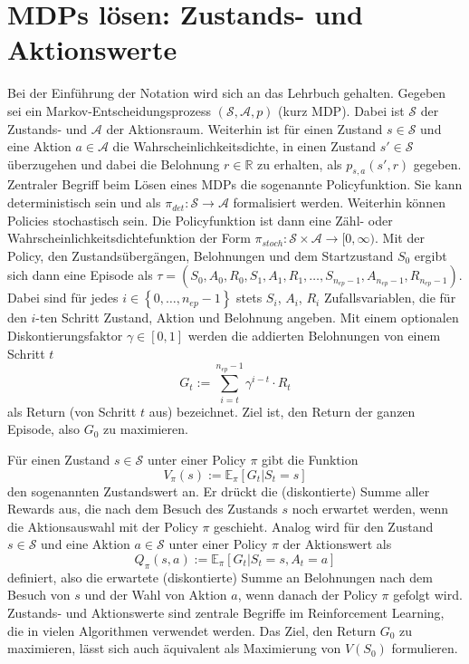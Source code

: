 \section{MDPs lösen: Zustands- und Aktionswerte}
\label{section:mdp_fundamentals}
Bei der Einführung der Notation wird sich an das Lehrbuch \cite{Sutton1998} gehalten.
Gegeben sei ein Markov-Entscheidungsprozess $(\mathcal{S}, \mathcal{A}, p)$ (kurz MDP).
Dabei ist $\mathcal{S}$ der Zustands- und $\mathcal{A}$ der Aktionsraum.
Weiterhin ist für einen Zustand $s\in \mathcal{S}$ und eine Aktion $a \in \mathcal{A}$ die Wahrscheinlichkeitsdichte, in einen Zustand $s' \in \mathcal{S}$ überzugehen und dabei die Belohnung $r \in \mathbb{R}$ zu erhalten, als $p_{s,a}(s', r)$ gegeben.
Zentraler Begriff beim Lösen eines MDPs die sogenannte Policyfunktion.
Sie kann deterministisch sein und als $\pi_{det}: \mathcal{S} \rightarrow \mathcal{A}$ formalisiert werden.
Weiterhin können Policies stochastisch sein.
Die Policyfunktion ist dann eine Zähl- oder Wahrscheinlichkeitsdichtefunktion der Form $\pi_{stoch}: \mathcal{S}\times\mathcal{A}\rightarrow [0, \infty)$.
Mit der Policy, den Zustandsübergängen, Belohnungen und dem Startzustand $S_0$ ergibt sich dann eine Episode als $\tau = \left(S_0, A_0, R_0, S_1, A_1, R_1, \dots, S_{n_{ep} - 1}, A_{n_{ep} - 1}, R_{n_{ep} - 1}\right)$.
Dabei sind für jedes $i \in \left\lbrace0, \dots, n_{ep} - 1\right\rbrace$ stets $S_i$, $A_i$, $R_i$ Zufallsvariablen, die für den $i$-ten Schritt Zustand, Aktion und Belohnung angeben.
Mit einem optionalen Diskontierungsfaktor $\gamma \in [0, 1]$ werden die addierten Belohnungen von einem Schritt $t$ 
\begin{equation}
	G_t := \sum_{i=t}^{n_{ep} - 1} \gamma^{i - t} \cdot R_t
\end{equation}
als Return (von Schritt $t$ aus) bezeichnet.
Ziel ist, den Return der ganzen Episode, also $G_0$ zu maximieren.

Für einen Zustand $s \in \mathcal{S}$ unter einer Policy $\pi$ gibt die Funktion
\begin{equation}
	V_\pi(s) := \mathbb{E}_\pi\left[G_t | S_t = s\right]
\end{equation}
den sogenannten Zustandswert an.
Er drückt die (diskontierte) Summe aller Rewards aus, die nach dem Besuch des Zustands $s$ noch erwartet werden, wenn die Aktionsauswahl mit der Policy $\pi$ geschieht.
Analog wird für den Zustand $s \in \mathcal{S}$ und eine Aktion $a \in \mathcal{S}$ unter einer Policy $\pi$ der Aktionswert als
\begin{equation}
	Q_\pi(s, a) := \mathbb{E}_\pi\left[G_t | S_t = s, A_t = a\right]
\end{equation}
definiert, also die erwartete (diskontierte) Summe an Belohnungen nach dem Besuch von $s$ und der Wahl von Aktion $a$, wenn danach der Policy $\pi$ gefolgt wird.
Zustands- und Aktionswerte sind zentrale Begriffe im Reinforcement Learning, die in vielen Algorithmen verwendet werden.
Das Ziel, den Return $G_0$ zu maximieren, lässt sich auch äquivalent als Maximierung von $V(S_0)$ formulieren.

